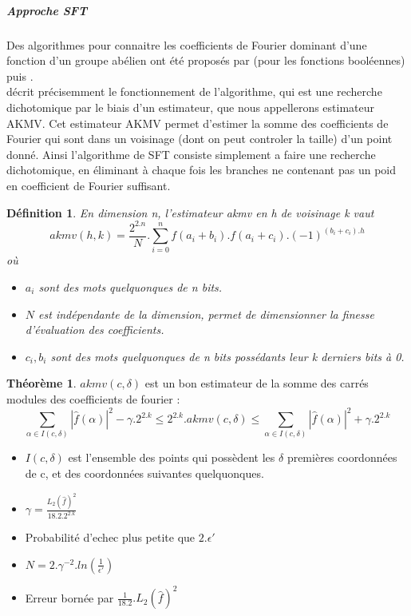 \documentclass{article}		%
\newtheorem{defi}{Définition}
\theoremstyle{definition}
\newtheorem{theo}{Théorème}
\theoremstyle{plain}
\begin{document}
\subparagraph{Approche SFT}
\label{SFT}
Des algorithmes pour connaitre les coefficients de Fourier dominant d'une fonction d'un groupe
abélien ont été proposés par \cite{Mansour} (pour les fonctions booléennes)
puis  \cite{Akavia}.
\\
\cite{Vaudenay} décrit précisemment le fonctionnement de
l'algorithme, qui est une recherche dichotomique par le biais d'un
estimateur, que nous appellerons estimateur AKMV. Cet estimateur AKMV
permet d'estimer la somme des coefficients de Fourier qui sont dans un
voisinage (dont on peut controler la taille) d'un point donné. Ainsi
l'algorithme de SFT consiste simplement a faire une recherche
dichotomique, en éliminant à chaque fois les branches ne contenant pas un
poid en coefficient de Fourier suffisant.
\begin{defi}
 En dimension n, l'estimateur akmv en h de voisinage k vaut
$$akmv(h,k)=\frac{2^{2.n}}{N}.\sum_{i=0}^{n}
f(a_i+b_i).f(a_i+c_i).(-1)^{(b_i+c_i).h}$$
où 
\begin{itemize}
\item $a_i$ sont des mots quelquonques de n bits.
\item $N$ est indépendante de la dimension, permet de dimensionner la
finesse d'évaluation des coefficients.
\item $c_i,b_i$ sont des mots quelquonques de n bits possédants leur k derniers bits à
0.
\end{itemize}
\end{defi}

\begin{theo}\cite{Vaudenay}
$akmv(c,\delta)$ est un bon estimateur de la somme des carrés modules des coefficients
de fourier :
$$\sum_{\alpha\in I(c,\delta)} |\hat{f}(\alpha)|^2 - \gamma.2^{2.k}\leq
2^{2.k}.akmv(c,\delta)\leq
\sum_{\alpha\in I(c,\delta)} |\hat{f}(\alpha)|^2 +  \gamma.2^{2.k}$$
\begin{itemize}
\item $I(c,\delta)$ est l'ensemble des points qui possèdent les $\delta$
premières coordonnées de c, et des coordonnées suivantes quelquonques.
\item $\gamma=\frac{L_2(\hat{f})^2}{18.2.2^{2.k}}$
\item Probabilité d'echec plus petite que $2.\epsilon'$ 
\item $N=2.\gamma^{-2}.ln(\frac{1}{\epsilon'})$
\item Erreur bornée par $\frac{1}{18.2}.L_2(\hat{f})^2$ 
\end{itemize} 
\end{theo}
\end{document}
